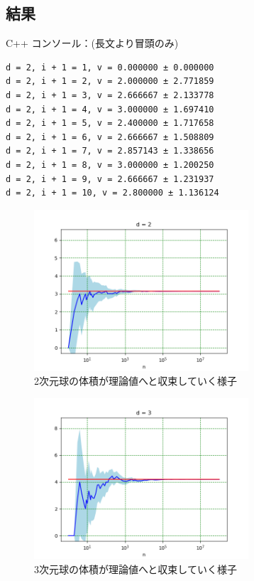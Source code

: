 \documentclass[a4paper,twoside]{jarticle}
\begin{document}
\subsection{結果}
C++ コンソール：(長文より冒頭のみ)
\begin{lstlisting}[numbers=none]
d = 2, i + 1 = 1, v = 0.000000 ± 0.000000
d = 2, i + 1 = 2, v = 2.000000 ± 2.771859
d = 2, i + 1 = 3, v = 2.666667 ± 2.133778
d = 2, i + 1 = 4, v = 3.000000 ± 1.697410
d = 2, i + 1 = 5, v = 2.400000 ± 1.717658
d = 2, i + 1 = 6, v = 2.666667 ± 1.508809
d = 2, i + 1 = 7, v = 2.857143 ± 1.338656
d = 2, i + 1 = 8, v = 3.000000 ± 1.200250
d = 2, i + 1 = 9, v = 2.666667 ± 1.231937
d = 2, i + 1 = 10, v = 2.800000 ± 1.136124
\end{lstlisting}

\begin{figure}[H]
\begin{center}
\includegraphics[width=8cm]{../python/report1_monte_carlo/out/r2plot2d.png}
\end{center}
\caption{2次元球の体積が理論値へと収束していく様子}
\end{figure}

\begin{figure}[H]
\begin{center}
\includegraphics[width=8cm]{../python/report1_monte_carlo/out/r2plot3d.png}
\end{center}
\caption{3次元球の体積が理論値へと収束していく様子}
\end{figure}
\end{document}
